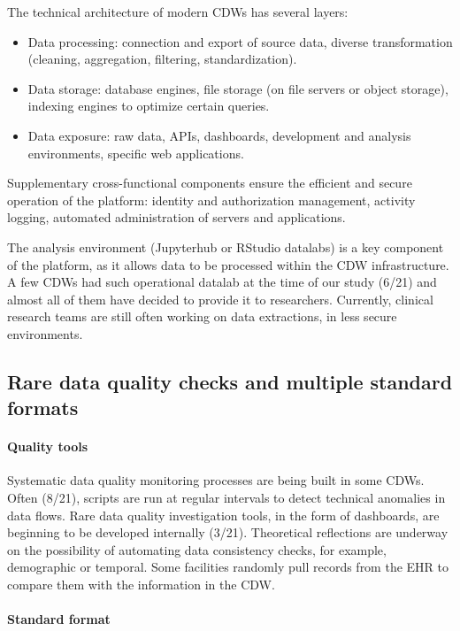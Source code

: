 \documentclass[french,12pt,twoside,a4paper]{book}
\begin{document}
The technical architecture of modern CDWs has several layers:
\begin{itemize}
  \item Data processing: connection and export of source data, diverse
        transformation (cleaning, aggregation, filtering, standardization).
  \item Data storage: database engines, file storage (on file servers or object
        storage), indexing engines to optimize certain queries.
  \item Data exposure: raw data, APIs, dashboards, development and analysis
        environments, specific web applications.
\end{itemize}
Supplementary cross-functional components ensure the efficient and secure
operation of the platform: identity and authorization management, activity
logging, automated administration of servers and applications.

The analysis environment (Jupyterhub or RStudio datalabs) is a key component of
the platform, as it allows data to be processed within the CDW infrastructure. A
few CDWs had such operational datalab at the time of our study (6/21) and almost
all of them have decided to provide it to researchers. Currently, clinical
research teams are still often working on data extractions, in less secure
environments.

\subsection{Rare data quality checks and multiple standard formats}%
\label{subsec:cdw:results:data_quality}%

\paragraph{Quality tools}

Systematic data quality monitoring processes are
being built in some CDWs. Often (8/21), scripts are run at regular intervals to
detect technical anomalies in data flows. Rare data quality investigation tools,
in the form of dashboards, are beginning to be developed internally (3/21).
Theoretical reflections are underway on the possibility of automating data
consistency checks, for example, demographic or temporal. Some facilities
randomly pull records from the EHR to compare them with the information in the
CDW.

\paragraph{Standard format}
\end{document}

